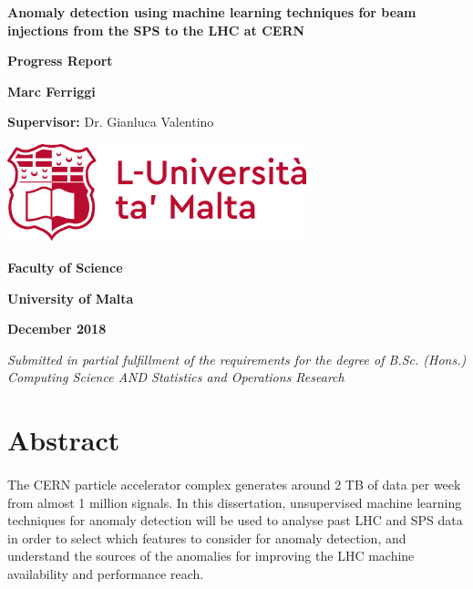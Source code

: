 \documentclass[12pt, twoside]{report}
\begin{document}
	\begin{titlepage}
		\centering
		{\LARGE\bfseries Anomaly detection using machine learning techniques for beam injections from the SPS to the LHC at CERN\par}
		\vspace{.5cm}
		
		{\Large \textbf{Progress Report} \par}
		\vspace{.5cm}
		
		{\large \textbf{Marc Ferriggi}\par}
		\vspace{0.5cm}
		
		{\large \textbf{Supervisor:} Dr. Gianluca Valentino\par}
		\vfill
		
		\includegraphics[width=0.65\textwidth]{UoMLogo}\par
		\vfill
		
		{\large\bfseries Faculty of Science \par}
		{\large\bfseries University of Malta \par}
		{\large\bfseries December 2018 \par}
		
		\vspace{1cm}
		\textit{Submitted in partial fulfillment of the requirements for the degree of B.Sc. (Hons.) Computing Science AND Statistics and Operations Research}
	\end{titlepage}
	
	\tableofcontents
	\vfill
	\cleardoublepage
	
	\section{Abstract}
	\paragraph{ }The CERN particle accelerator complex generates around 2 TB of data per week from almost 1 million signals. In this dissertation, unsupervised machine learning techniques for anomaly detection will be used to analyse past LHC and SPS data in order to select which features to consider for anomaly detection, and understand the sources of the anomalies for improving the LHC machine availability and performance reach.
	
\end{document}

